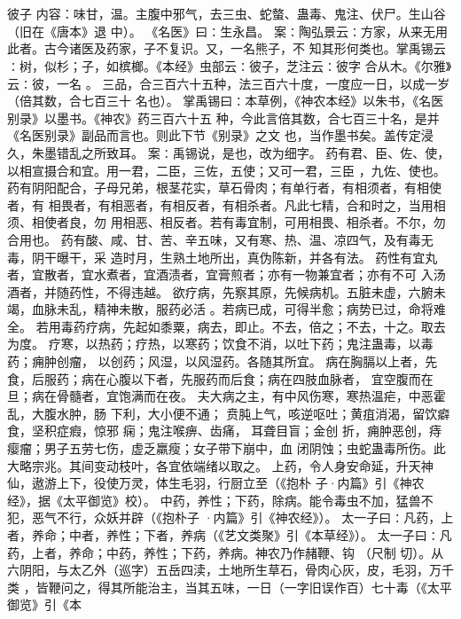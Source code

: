 \documentclass[12pt,UTF8]{ctexbook}
\begin{document}
\chapter{}彼子
内容：味甘，温。主腹中邪气，去三虫、蛇螫、蛊毒、鬼注、伏尸。生山谷（旧在《唐本》退 
中）。 
《名医》曰∶生永昌。 
案∶陶弘景云∶方家，从来无用此者。古今诸医及药家，子不复识。又，一名熊子，不 
知其形何类也。掌禹锡云∶树，似杉；子，如槟榔。《本经》虫部云∶彼子，芝注云∶彼字 
合从木。《尔雅》云∶彼，一名 。 
三品，合三百六十五种，法三百六十度，一度应一日，以成一岁（倍其数，合七百三十 
名也）。 
掌禹锡曰∶本草例，《神农本经》以朱书，《名医别录》以墨书。《神农》药三百六十五 
种，今此言倍其数，合七百三十名，是并《名医别录》副品而言也。则此下节《别录》之文 
也，当作墨书矣。盖传定浸久，朱墨错乱之所致耳。 
案∶禹锡说，是也，改为细字。 
药有君、臣、佐、使，以相宣摄合和宜。用一君，二臣，三佐，五使；又可一君，三臣 
，九佐、使也。 
药有阴阳配合，子母兄弟，根茎花实，草石骨肉；有单行者，有相须者，有相使者，有 
相畏者，有相恶者，有相反者，有相杀者。凡此七精，合和时之，当用相须、相使者良，勿 
用相恶、相反者。若有毒宜制，可用相畏、相杀者。不尔，勿合用也。 
药有酸、咸、甘、苦、辛五味，又有寒、热、温、凉四气，及有毒无毒，阴干曝干，采 
造时月，生熟土地所出，真伪陈新，并各有法。 
药性有宜丸者，宜散者，宜水煮者，宜酒渍者，宜膏煎者；亦有一物兼宜者；亦有不可 
入汤酒者，并随药性，不得违越。 
欲疗病，先察其原，先候病机。五脏未虚，六腑未竭，血脉未乱，精神未散，服药必活 
。若病已成，可得半愈；病势已过，命将难全。 
若用毒药疗病，先起如黍粟，病去，即止。不去，倍之；不去，十之。取去为度。 
疗寒，以热药；疗热，以寒药；饮食不消，以吐下药；鬼注蛊毒，以毒药；痈肿创瘤， 
以创药；风湿，以风湿药。各随其所宜。 
病在胸膈以上者，先食，后服药；病在心腹以下者，先服药而后食；病在四肢血脉者， 
宜空腹而在旦；病在骨髓者，宜饱满而在夜。 
夫大病之主，有中风伤寒，寒热温疟，中恶霍乱，大腹水肿，肠 下利，大小便不通； 
贲肫上气，咳逆呕吐；黄疽消渴，留饮癖食，坚积症瘕，惊邪 痫；鬼注喉痹、齿痛， 
耳聋目盲；金创 折，痈肿恶创，痔 瘿瘤；男子五劳七伤，虚乏羸瘦；女子带下崩中，血 
闭阴蚀；虫蛇蛊毒所伤。此大略宗兆。其间变动枝叶，各宜依端绪以取之。 
上药，令人身安命延，升天神仙，遨游上下，役使万灵，体生毛羽，行厨立至（《抱朴 
子·内篇》引《神农经》，据《太平御览》校）。 
中药，养性；下药，除病。能令毒虫不加，猛兽不犯，恶气不行，众妖并辟（《抱朴子 
·内篇》引《神农经》）。 
太一子曰∶凡药，上者，养命；中者，养性；下者，养病（《艺文类聚》引《本草经》）。 
太一子曰∶凡药，上者，养命；中药，养性；下药，养病。神农乃作赭鞭、钩 （尺制 
切）。从六阴阳，与太乙外（巡字）五岳四渎，土地所生草石，骨肉心灰，皮，毛羽，万千 
类 
，皆鞭问之，得其所能治主，当其五味，一日（一字旧误作百）七十毒（《太平御览》引《本 
\end{document}
